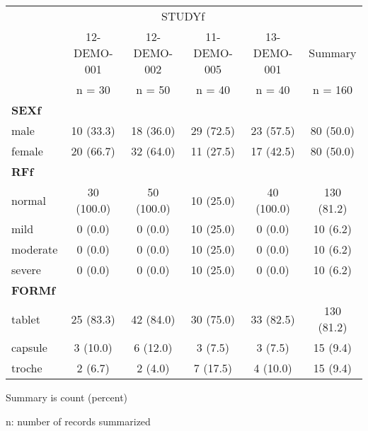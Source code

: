 \setlength{\tabcolsep}{5pt} 
\begin{threeparttable}
\renewcommand{\arraystretch}{1.3}
\begin{tabular}[h]{lccccc}
\hline
\multicolumn{1}{c}{} & \multicolumn{4}{c}{STUDYf} & \multicolumn{1}{c}{} \\
\cmidrule(lr){2-5}
 & 12-DEMO-001 & 12-DEMO-002 & 11-DEMO-005 & 13-DEMO-001 & Summary \\ [-0.52em]
 & n = 30 & n = 50 & n = 40 & n = 40 & n = 160 \\
\hline
\multicolumn{6}{l}{\textbf{SEXf}}\\
male & 10 (33.3) & 18 (36.0) & 29 (72.5) & 23 (57.5) & 80 (50.0) \\
female & 20 (66.7) & 32 (64.0) & 11 (27.5) & 17 (42.5) & 80 (50.0) \\
\hline \multicolumn{6}{l}{\textbf{RFf}}\\
normal & 30 (100.0) & 50 (100.0) & 10 (25.0) & 40 (100.0) & 130 (81.2) \\
mild & 0 (0.0) & 0 (0.0) & 10 (25.0) & 0 (0.0) & 10 (6.2) \\
moderate & 0 (0.0) & 0 (0.0) & 10 (25.0) & 0 (0.0) & 10 (6.2) \\
severe & 0 (0.0) & 0 (0.0) & 10 (25.0) & 0 (0.0) & 10 (6.2) \\
\hline \multicolumn{6}{l}{\textbf{FORMf}}\\
tablet & 25 (83.3) & 42 (84.0) & 30 (75.0) & 33 (82.5) & 130 (81.2) \\
capsule & 3 (10.0) & 6 (12.0) & 3 (7.5) & 3 (7.5) & 15 (9.4) \\
troche & 2 (6.7) & 2 (4.0) & 7 (17.5) & 4 (10.0) & 15 (9.4) \\
\hline
\end{tabular}
\begin{tablenotes}[flushleft]
\item Summary is count (percent)
\item n: number of records summarized
\end{tablenotes}
\end{threeparttable}
